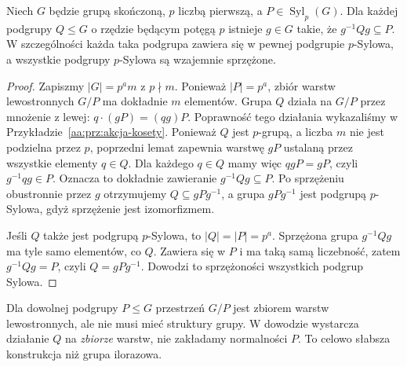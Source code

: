 \begin{twierdzenie}
\label{aa:tw:sylow2}
Niech $G$ będzie grupą skończoną, $p$ liczbą pierwszą,
a $P\in\operatorname{Syl}_p(G)$.
Dla każdej podgrupy $Q\le G$ o rzędzie będącym potęgą $p$
istnieje $g\in G$ takie, że $g^{-1}Qg\subseteq P$.
W szczególności każda taka podgrupa zawiera się w pewnej
podgrupie $p$-Sylowa, a wszystkie podgrupy $p$-Sylowa
są wzajemnie sprzężone.
\end{twierdzenie}
\begin{proof}
Zapiszmy $|G|=p^a m$ z $p\nmid m$.
Ponieważ $|P|=p^a$, zbiór warstw lewostronnych
$G/P$ ma dokładnie $m$ elementów.
Grupa $Q$ działa na $G/P$ przez mnożenie z lewej:
$q\cdot(gP)=(qg)P$. Poprawność tego działania
wykazaliśmy w Przykładzie~\ref{aa:prz:akcja-kosety}.
Ponieważ $Q$ jest $p$-grupą, a liczba $m$ nie jest
podzielna przez $p$, poprzedni lemat zapewnia warstwę
$gP$ ustalaną przez wszystkie elementy $q\in Q$.
Dla każdego $q\in Q$ mamy więc
$qgP=gP$, czyli $g^{-1}qg\in P$.
Oznacza to dokładnie zawieranie $g^{-1}Qg\subseteq P$.
Po sprzężeniu obustronnie przez $g$ otrzymujemy
$Q\subseteq gPg^{-1}$, a grupa $gPg^{-1}$ jest
podgrupą $p$-Sylowa, gdyż sprzężenie jest izomorfizmem.

Jeśli $Q$ także jest podgrupą $p$-Sylowa, to
$|Q|=|P|=p^a$.
Sprzężona grupa $g^{-1}Qg$ ma tyle samo elementów,
co $Q$. Zawiera się w $P$ i ma taką samą liczebność,
zatem $g^{-1}Qg=P$, czyli $Q=gPg^{-1}$.
Dowodzi to sprzężoności wszystkich podgrup Sylowa.
\end{proof}

\begin{uwaga}
Dla dowolnej podgrupy $P\le G$ przestrzeń $G/P$
jest zbiorem warstw lewostronnych, ale nie musi mieć
struktury grupy. W dowodzie wystarcza działanie $Q$
na \emph{zbiorze} warstw, nie zakładamy normalności $P$.
To celowo słabsza konstrukcja niż grupa ilorazowa.
\end{uwaga}


